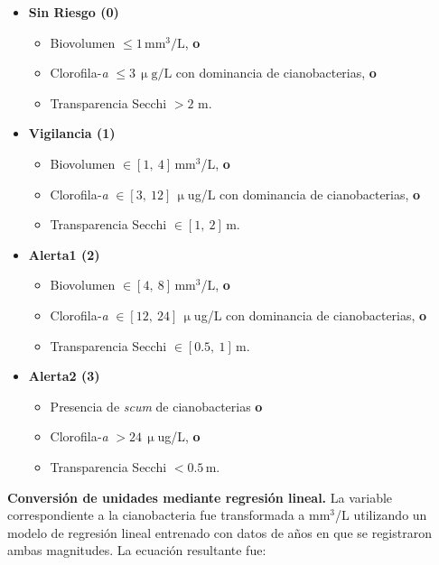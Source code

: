 \documentclass[11pt]{report}
\begin{document}
\begin{itemize}[leftmargin=*]
  \item \textbf{Sin Riesgo (0)}
        \begin{itemize}[noitemsep]
            \item Biovolumen $\leq 1\,\mathrm{mm}^3/\mathrm{L}$, \textbf{o}
            \item Clorofila-\emph{a} $\leq 3\,\upmu\mathrm{g}/\mathrm{L}$ con dominancia de cianobacterias, \textbf{o}
            \item Transparencia Secchi $> 2$ m.
        \end{itemize}

        
  \item \textbf{Vigilancia (1)}
        \begin{itemize}[noitemsep]
          \item Biovolumen $\in [1,\ 4]$\,mm$^{3}$/L, \textbf{o}
          \item Clorofila‑\emph{a} $\in [3,\ 12]$\,$\upmu$ug/L con dominancia de cianobacterias, \textbf{o}
          \item Transparencia Secchi $\in [1,\ 2]$\,m.
        \end{itemize}

  \item \textbf{Alerta1 (2)}
        \begin{itemize}[noitemsep]
          \item Biovolumen $\in [4,\ 8] $\,mm$^{3}$/L, \textbf{o}
          \item Clorofila‑\emph{a} $\in [12,\ 24] $\,$\upmu$ug/L con dominancia de cianobacterias, \textbf{o}
          \item Transparencia Secchi $\in [0.5,\ 1] $\,m.
        \end{itemize}

  \item \textbf{Alerta2 (3)}
        \begin{itemize}[noitemsep]
          \item Presencia de \emph{scum} de cianobacterias \textbf{o}
          \item Clorofila‑\emph{a} $> 24$\,$\upmu$ug/L, \textbf{o}
          \item Transparencia Secchi $< 0.5$\,m.
        \end{itemize}
\end{itemize}

\textbf{Conversión de unidades mediante regresión lineal.}  
La variable correspondiente a la cianobacteria fue transformada a mm$^{3}$/L utilizando un modelo de regresión lineal entrenado con datos de años en que se registraron ambas magnitudes. La ecuación resultante fue:
\end{document}
